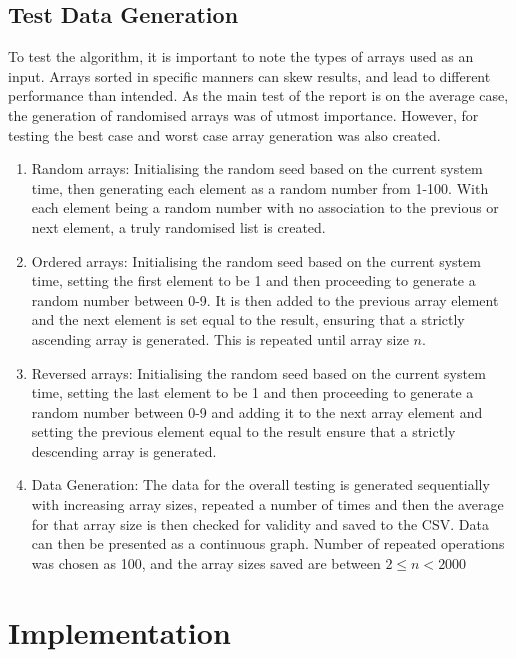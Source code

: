 \documentclass[]{article}
\begin{document}
\subsection{Test Data Generation}
To test the algorithm, it is important to note the types of arrays used as an input. Arrays sorted in specific manners can skew results, and lead to different performance than intended. As the main test of the report is on the average case, the generation of randomised arrays was of utmost importance. However, for testing the best case and worst case array generation was also created. 

\begin{enumerate}
	\item Random arrays: Initialising the random seed based on the current system time, then generating each element as a random number from 1-100. With each element being a random number with no association to the previous or next element, a truly randomised list is created.
	\item Ordered arrays: Initialising the random seed based on the current system time, setting the first element to be 1 and then proceeding to generate a random number between 0-9. It is then added to the previous array element and the next element is set equal to the result, ensuring that a strictly ascending array is generated. This is repeated until array size $n$.
	\item Reversed arrays: Initialising the random seed based on the current system time, setting the last element to be 1 and then proceeding to generate a random number between 0-9 and adding it to the next array element and setting the previous element equal to the result ensure that a strictly descending array is generated.
	\item Data Generation: The data for the overall testing is generated sequentially with increasing array sizes, repeated a number of times and then the average for that array size is then checked for validity and saved to the CSV. Data can then be presented as a continuous graph. Number of repeated operations was chosen as 100, and the array sizes saved are between $2\le n < 2000$
\end{enumerate}
\section{Implementation}
\end{document}

